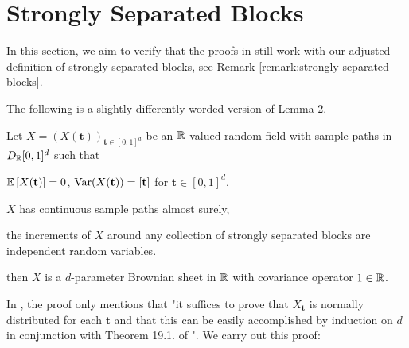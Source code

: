 
\section{Strongly Separated Blocks}
\label{section strongly separated blocks}

In this section, we aim to verify that the proofs in \cite{[16]deo1975functional} still work with our adjusted definition of strongly separated blocks, see Remark \ref{remark:strongly separated blocks}.

The following is a slightly differently worded version of \cite{[16]deo1975functional} Lemma 2.
\begin{lemma} \label{deo lemma 2}
    Let $X = (X(\mathbf{t}))_{\mathbf{t} \in [0,1]^d}$ be an $\mathbb{R}$-valued random field with sample paths in $D_{\mathbb{R}}[0,1]^d$ such that
    \begin{aufzii}
        \item $\mathbb{E}\left[X(\mathbf{t})\right] = 0$, $\mathrm{Var}(X(\mathbf{t})) = [\mathbf{t}]$ for $\mathbf{t} \in [0,1]^d$,
        \item $X$ has continuous sample paths almost surely,
        \item the increments of $X$ around any collection of strongly separated blocks are independent random variables.
    \end{aufzii}
    then $X$ is a $d$-parameter Brownian sheet in $\mathbb{R}$ with covariance operator $1 \in \mathbb{R}$.
\end{lemma}
In \cite{[16]deo1975functional}, the proof only mentions that "it suffices to prove that $X_\mathbf{t}$ is normally distributed for each $\mathbf{t}$ and that this can be easily accomplished by induction on $d$ in conjunction with Theorem 19.1. of \cite{[4]billingsley1968convergence}". We carry out this proof:
